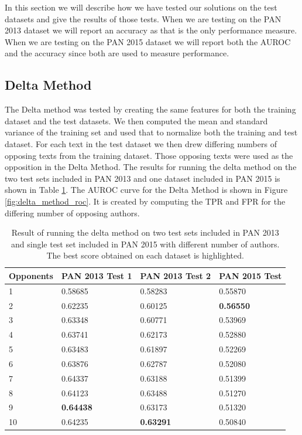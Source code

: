 In this section we will describe how we have tested our solutions on the test
datasets and give the results of those tests. When we are testing on the PAN
2013 dataset we will report an accuracy as that is the only performance measure.
When we are testing on the PAN 2015 dataset we will report both the \gls{AUROC}
and the accuracy since both are used to measure performance.

\subsection{Delta Method}
The Delta method was tested by creating the same features for both the training
dataset and the test datasets. We then computed the mean and standard variance
of the training set and used that to normalize both the training and test
dataset. For each text in the test dataset we then drew differing numbers of
opposing texts from the training dataset. Those opposing texts were used as the
opposition in the Delta Method. The results for running the delta method on
the two test sets included in PAN 2013 and one dataset included in PAN 2015 is
shown in Table \ref{tab:delta_method_final_results}. The \gls{AUROC} curve for
the Delta Method is shown in Figure \ref{fig:delta_method_roc}. It is created
by computing the \gls{TPR} and \gls{FPR} for the differing number of opposing
authors.

\begin{table}
    \centering
    \begin{tabular}{l|lll}
        \textbf{Opponents} & \textbf{PAN 2013 Test 1} & \textbf{PAN 2013 Test 2}
        & \textbf{PAN 2015 Test} \\ \hline
        1  & 0.58685 & 0.58283 & 0.55870 \\
        2  & 0.62235 & 0.60125 & \textbf{0.56550} \\
        3  & 0.63348 & 0.60771 & 0.53969 \\
        4  & 0.63741 & 0.62173 & 0.52880 \\
        5  & 0.63483 & 0.61897 & 0.52269 \\
        6  & 0.63876 & 0.62787 & 0.52080 \\
        7  & 0.64337 & 0.63188 & 0.51399 \\
        8  & 0.64123 & 0.63488 & 0.51270 \\
        9  & \textbf{0.64438} & 0.63173 & 0.51320 \\
        10 & 0.64235 & \textbf{0.63291} & 0.50840
    \end{tabular}
    \caption{Result of running the delta method on two test sets included in PAN
    2013 and single test set included in PAN 2015 with different number of
    authors. The best score obtained on each dataset is highlighted.}
    \label{tab:delta_method_final_results}
\end{table}

